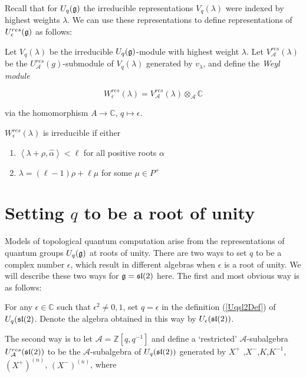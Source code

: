 Recall that for $U_q(\mathfrak{g})$ the irreducible representations $V_q(\lambda)$
were indexed by highest weights $\lambda$. We can use these representations to
define representations of $U_\epsilon^{res}(\mathfrak{g})$ as follows:


Let $V_q(\lambda)$ be the irreducible $U_q(\mathfrak{g})$-module with highest weight
$\lambda$. Let $V_\mathcal{A}^{res}(\lambda)$ be the
$U_\mathcal{A}^{res}(g)$-submodule of $V_q(\lambda)$ generated by $v_\lambda$,
and define the \emph{Weyl module}

\begin{equation}
    W_\epsilon^{res}(\lambda) = V_\mathcal{A}^{res}(\lambda) \otimes_\mathcal{A} \mathbb{C}
\end{equation}

via the homomorphism $A \to \mathbb{C}$, $q \mapsto \epsilon$.

\begin{claim}
    $W_\epsilon^{res}(\lambda)$ is irreducible if either 
    \begin{enumerate}
        \item $\left< \lambda + \rho, \hat{\alpha}\right> < \ell$ for all positive
            roots $\alpha$
        \item $\lambda = (\ell - 1) \rho + \ell \mu$ for some $\mu \in P^+$
    \end{enumerate}
\end{claim}


\section{Setting $q$ to be a root of unity}

Models of topological quantum computation arise from the representations of
quantum groups $U_q(\mathfrak{g})$ at roots of unity. There are two ways to set $q$ to
be a complex  number  $\epsilon$, which result in different algebras when
$\epsilon$ is a root of unity. We will describe these two ways for $\mathfrak{g} =
\mathfrak{sl}(2)$ here. The first and most obvious way is as follows: 

For any $\epsilon \in \mathbb{C}$ such that $\epsilon ^2 \neq 0,1$, set $q =
\epsilon$ in the definition (\ref{Uqsl2Def}) of $U_q(\mathfrak{sl}(2)$. Denote the
algebra obtained in this way by $U_\epsilon(\mathfrak{sl}(2))$. 

The second way is to let $\mathcal{A} = \mathbb{Z}[q,q^{-1}]$ and define a
`restricted' $\mathcal{A}$-subalgebra $U_\mathcal{A}^{res}(\mathfrak{sl}(2))$ to be the
$\mathcal{A}$-subalgebra of $U_q(\mathfrak{sl}(2))$ generated by $ X^+$ ,$X^-$,$K$,$K^{-1}$, $(X^+) ^{(n)}$,
$(X^-)^{(n)}$, where



